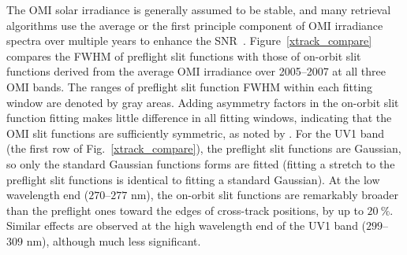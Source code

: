 \documentclass[amt,manuscript]{copernicus}
\begin{document}
The OMI solar irradiance is generally assumed to be stable, and many retrieval algorithms use the average or the first principle component of OMI irradiance spectra over multiple years to enhance the SNR~\citep{liu2010ozone,wang2014water,abad2015updated}. Figure~\ref{xtrack_compare} compares the FWHM of preflight slit functions with those of on-orbit slit functions derived from the average OMI irradiance over 2005--2007 at all three OMI bands. The ranges of preflight slit function FWHM within each fitting window are denoted by gray areas. Adding asymmetry factors in the on-orbit slit function fitting makes little difference in all fitting windows, indicating that the OMI slit functions are sufficiently symmetric, as noted by \citet{Beirle2016parameterizing}. For the UV1 band (the first row of Fig.~\ref{xtrack_compare}), the preflight slit functions are Gaussian, so only the standard Gaussian functions forms are fitted (fitting a stretch to the preflight slit functions is identical to fitting a standard Gaussian). At the low wavelength end ($270$--$277$ nm), the on-orbit slit functions are remarkably broader than the preflight ones toward the edges of cross-track positions, by up to $20~\%$. Similar effects are observed at the high wavelength end of the UV1 band ($299$--$309$ nm), although much less significant.
\end{document}
